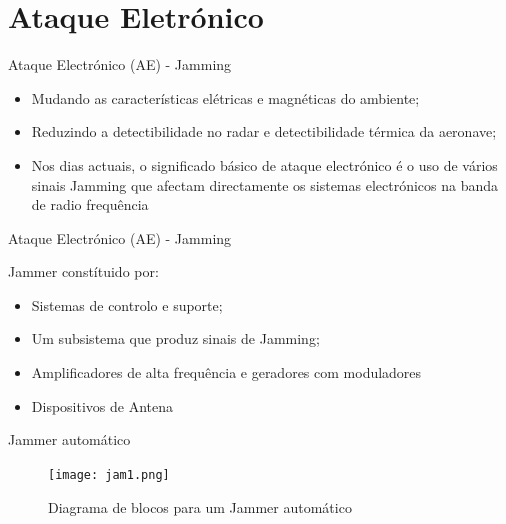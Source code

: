 \documentclass[portuguese,10pt]{beamer}
\begin{document}


\section{Ataque Eletrónico}

\begin{frame}{Ataque Electrónico (AE) - Jamming }
    \begin{itemize}
        \item Mudando as características elétricas e magnéticas do ambiente;
        \vspace*{3mm}
        \item  Reduzindo a detectibilidade no radar e detectibilidade térmica da aeronave; 
        \vspace*{3mm}
        \item Nos dias actuais, o significado básico de ataque electrónico é o uso de vários sinais Jamming que afectam directamente os sistemas electrónicos na banda de radio frequência
    
    \end{itemize}
    
   
\end{frame}

\begin{frame}{Ataque Electrónico (AE) - Jamming }
    
    Jammer constítuido por: 
     \vspace*{5mm}
    \begin{itemize}
        \item Sistemas de controlo e suporte;
        \vspace*{3mm}
        \item  Um subsistema que produz sinais de Jamming; 
        \vspace*{3mm}
        \item Amplificadores de alta frequência e geradores com moduladores
         \vspace*{3mm}
         \item Dispositivos de Antena
    
    \end{itemize}
    
   
\end{frame}


\begin{frame}{Jammer automático}
    
\begin{figure}[ht]
\centering
\texttt{[image: jam1.png]}
\caption{Diagrama de blocos para um Jammer automático}
\label{jam1}
\end{figure} 
\end{frame}
\end{document}
